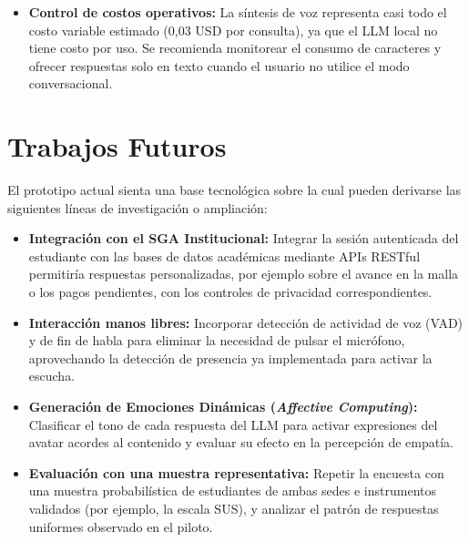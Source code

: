 \begin{itemize}
    \item \textbf{Control de costos operativos:} La síntesis de voz representa casi todo el costo variable estimado (0,03 USD por consulta), ya que el LLM local no tiene costo por uso. Se recomienda monitorear el consumo de caracteres y ofrecer respuestas solo en texto cuando el usuario no utilice el modo conversacional.
\end{itemize}

\section{Trabajos Futuros}
El prototipo actual sienta una base tecnológica sobre la cual pueden derivarse las siguientes líneas de investigación o ampliación:

\begin{itemize}
    \item \textbf{Integración con el SGA Institucional:} Integrar la sesión autenticada del estudiante con las bases de datos académicas mediante APIs RESTful permitiría respuestas personalizadas, por ejemplo sobre el avance en la malla o los pagos pendientes, con los controles de privacidad correspondientes.

    \item \textbf{Interacción manos libres:} Incorporar detección de actividad de voz (VAD) y de fin de habla para eliminar la necesidad de pulsar el micrófono, aprovechando la detección de presencia ya implementada para activar la escucha.

    \item \textbf{Generación de Emociones Dinámicas (\textit{Affective Computing}):} Clasificar el tono de cada respuesta del LLM para activar expresiones del avatar acordes al contenido y evaluar su efecto en la percepción de empatía.

    \item \textbf{Evaluación con una muestra representativa:} Repetir la encuesta con una muestra probabilística de estudiantes de ambas sedes e instrumentos validados (por ejemplo, la escala SUS), y analizar el patrón de respuestas uniformes observado en el piloto.
\end{itemize}
